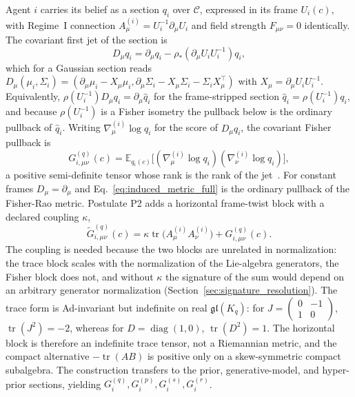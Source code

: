 \documentclass[11pt]{article}
\begin{document}
Agent $i$ carries its belief as a section $q_i$ over $\mathcal{C}$, expressed in its frame $U_i(c)$, with Regime~I connection $A^{(i)}_\mu = U_i^{-1}\partial_\mu U_i$ and field strength $F_{\mu\nu} = 0$ identically. The covariant first jet of the section is
\begin{equation}
D_\mu q_i = \partial_\mu q_i - \rho_*\left(\partial_\mu U_i U_i^{-1}\right) q_i ,
\label{eq:covariant_jet}
\end{equation}
which for a Gaussian section reads $D_\mu(\mu_i, \Sigma_i) = (\partial_\mu\mu_i - X_\mu\mu_i, \partial_\mu\Sigma_i - X_\mu\Sigma_i - \Sigma_i X_\mu^\top)$ with $X_\mu = \partial_\mu U_i U_i^{-1}$. Equivalently, $\rho(U_i^{-1})D_\mu q_i = \partial_\mu \hat{q}_i$ for the frame-stripped section $\hat{q}_i = \rho(U_i^{-1})q_i$, and because $\rho(U_i^{-1})$ is a Fisher isometry the pullback below is the ordinary pullback of $\hat{q}_i$. Writing $\nabla^{(i)}_\mu \log q_i$ for the score of $D_\mu q_i$, the covariant Fisher pullback is
\begin{equation}
\boxed{G^{(q)}_{i,\mu\nu}(c) = \mathbb{E}_{q_i(c)}\big[(\nabla^{(i)}_\mu \log q_i)(\nabla^{(i)}_\nu \log q_i)\big],}
\label{eq:induced_metric_full}
\end{equation}
a positive semi-definite tensor whose rank is the rank of the jet~\cite[Ch.~B2]{DennisGaugeVFESuppB2026}. For constant frames $D_\mu = \partial_\mu$ and Eq.~\eqref{eq:induced_metric_full} is the ordinary pullback of the Fisher-Rao metric. Postulate P2 adds a horizontal frame-twist block with a declared coupling $\kappa$,
\begin{equation}
\widetilde{G}^{(q)}_{i,\mu\nu}(c) = \kappa\operatorname{tr}\big(A^{(i)}_\mu A^{(i)}_\nu\big) + G^{(q)}_{i,\mu\nu}(c).
\label{eq:combined_tensor}
\end{equation}
The coupling is needed because the two blocks are unrelated in normalization: the trace block scales with the normalization of the Lie-algebra generators, the Fisher block does not, and without $\kappa$ the signature of the sum would depend on an arbitrary generator normalization (Section~\ref{sec:signature_resolution}). The trace form is Ad-invariant but indefinite on real $\mathfrak{gl}(K_q)$: for $J=\left(\begin{smallmatrix}0&-1\\1&0\end{smallmatrix}\right)$, $\operatorname{tr}(J^2)=-2$, whereas for $D=\operatorname{diag}(1,0)$, $\operatorname{tr}(D^2)=1$. The horizontal block is therefore an indefinite trace tensor, not a Riemannian metric, and the compact alternative $-\operatorname{tr}(AB)$ is positive only on a skew-symmetric compact subalgebra. The construction transfers to the prior, generative-model, and hyper-prior sections, yielding $G_i^{(q)}, G_i^{(p)}, G_i^{(s)}, G_i^{(r)}$.
\end{document}
